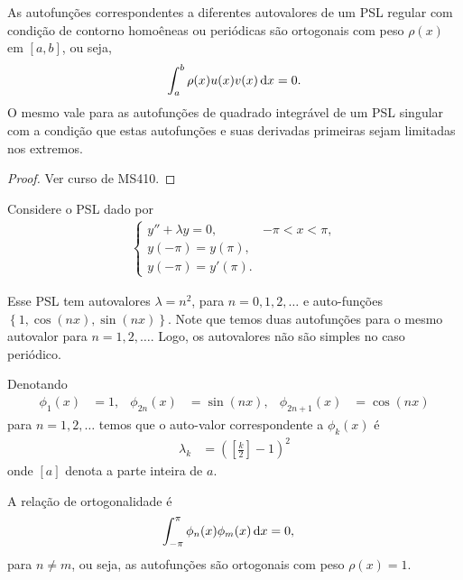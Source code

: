 \begin{teo}
    As autofunções correspondentes a diferentes autovalores de um PSL regular com condição de contorno homoêneas ou periódicas são ortogonais com peso $\rho(x)$ em $[a,b]$, ou seja,
    \begin{align*}
        \int_a^b \rho(x) u(x) v(x) \, \mathrm{d}x = 0.
    \end{align*}
    O mesmo vale para as autofunções de quadrado integrável de um PSL singular com a condição que estas autofunções e suas derivadas primeiras sejam limitadas nos extremos.
\end{teo}
\begin{proof}
    Ver curso de MS410.
\end{proof}
\begin{exem}
    Considere o PSL dado por
    \begin{align*}
        \begin{cases}
            y'' + \lambda y = 0, & -\pi < x < \pi, \\
            y(-\pi) = y(\pi), \\
            y(-\pi) = y'(\pi).
        \end{cases}
    \end{align*}

    Esse PSL tem autovalores $\lambda = n^2$, para $n = 0, 1, 2, \ldots$ e auto-funções $\left\{ 1, \cos\left( n x \right), \sin\left( n x \right) \right\}$. Note que temos duas autofunções para o mesmo autovalor para $n = 1, 2, \ldots$. Logo, os autovalores não são simples no caso periódico.

    Denotando
    \begin{align*}
        \phi_1(x) &= 1, & \phi_{2n}(x) &= \sin\left( n x \right), & \phi_{2n + 1}(x) &= \cos\left( n x \right)
    \end{align*}
    para $n = 1, 2, \ldots$ temos que o auto-valor correspondente a $\phi_k(x)$ é
    \begin{align*}
        \lambda_k &= \left( \left[ \frac{k}{2} \right] - 1 \right)^2
    \end{align*}
    onde $\left[ a \right]$ denota a parte inteira de $a$.

    A relação de ortogonalidade é
    \begin{align*}
        \int_{-\pi}^\pi \phi_n(x) \phi_m(x) \, \mathrm{d}x &= 0,
    \end{align*}
    para $n \neq m$, ou seja, as autofunções são ortogonais com peso $\rho(x) = 1$.
\end{exem}
